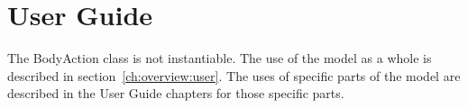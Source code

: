 %

\chapter{User Guide}\label{ch:\modelpartid:user}
The BodyAction class is not instantiable.
The use of the model as a whole is described in section~\ref{ch:overview:user}.
The uses of specific parts of the model are described in the User Guide
chapters for those specific parts.
